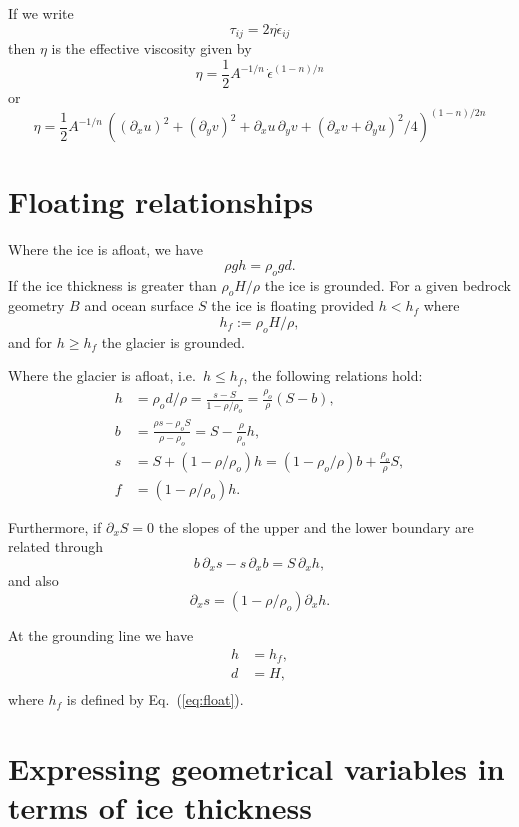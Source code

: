 \documentclass[10pt,a4paper]{book}
\newcommand{\p}{\partial}
\newcommand{\eij}{\dot{\epsilon}_{ij}}
\begin{document}
If we write
\[
\tau_{ij}= 2 \eta \eij
\]
then $\eta$ is the effective viscosity given by
\[
\eta=\frac{1}{2} A^{-1/n} \,\dot{\epsilon}^{(1-n)/n} 
\]
or
\begin{equation}
\eta= \frac{1}{2} A^{-1/n} \, ((\p_{x} u)^2 + (\p_{y} v)^2 + \p_{x} u \,\p_{y} v + (\p_{x} v + \p_{y} u)^2/4)^{(1-n)/2n}
  \label{eq:etaint3}
\end{equation}

\section{Floating relationships}
Where the ice is afloat, we have
\[  \rho g h = \rho_o g d .\]
If the ice thickness is greater than $\rho_o H/\rho$ the ice is grounded. For a given bedrock geometry $B$ and ocean
surface $S$ the ice is floating provided $h<h_f$ where
\begin{equation}
h_f := \rho_o H /\rho, 
\label{eq:float}
\end{equation}
and for $h \ge h_f$ the glacier is grounded.


Where the glacier is afloat, i.e.\ $h \le h_f$, the following relations hold:
\begin{align} 
h &= \rho_o d /\rho =\frac{s-S}{1-\rho/\rho_o} = \frac{\rho_o}{\rho} (S-b), \label{eq:hs1} \\
b &= \frac{\rho s - \rho_o S}{\rho-\rho_o}  = S-\frac{\rho}{\rho_o} h , \label{eq:bh1}\\
s &= S+(1-\rho/\rho_o) h = (1-\rho_o/\rho) b +\frac{\rho_o}{\rho} S, \label{eq:sb2}\\
f &= (1-\rho/\rho_o) h  . 
\end{align}

Furthermore, if $\p_x S=0$ the slopes of the upper and the lower boundary are related through
\begin{equation}
b \, \p_x s -  s \, \p_x b = S \, \p_x h,
\label{eq:resi}
\end{equation}
and also
\[ \p_x s=(1-\rho/\rho_o) \p_x h .\]

At the grounding line we have
\begin{align*}
h&=h_f , \\
d&=H,\\
\end{align*}
where $h_f$ is defined by Eq.~(\ref{eq:float}).


\section{Expressing geometrical variables in terms of ice thickness}
\end{document}
